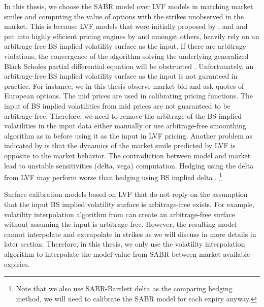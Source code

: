 \documentclass[letterpaper,12pt,titlepage,oneside,final]{book}
\numberwithin{equation}{section}
\theoremstyle{definition}
\begin{document}
In this thesis, we choose the SABR model over LVF models in matching market smiles and computing the value of options with the strikes unobserved in the market. This is because  LVF models that were initially proposed by \citet{dupire1994pricing}, \citet{DermanKani94} and \citet{rubinstein1994implied} and put into highly efficient pricing engines by \citet{Andersenl98} and \citet{dempster2000pricing} amongst others, heavily rely on an arbitrage-free  BS implied volatility surface as the input.  If there are arbitrage violations, the convergence of the algorithm solving the underlying generalized Black Scholes partial differential equation will be obstructed \cite{fengler2009arbitrage}. Unfortunately, an arbitrage-free BS implied volatility surface as the input is not guranteed in practice. For instance, we in this thesis observe market bid and ask quotes of European options. The mid prices are  used in calibrating pricing functions.  The input of BS implied volatilities from mid prices are not guaranteed to be arbitrage-free. Therefore, we need to remove the arbitrage of the BS implied volatilities in the input data either manually or use arbitrage-free smoonthing algorithm as in \cite{fengler2009arbitrage} before using it as the input in LVF pricing. Another problem as indicated by \citet{hagan2002managing} is that the dynamics of the market smile predicted by LVF is opposite to the market behavior. The contradiction between model and market lead to unstable sensitivities (delta, vega) computation. Hedging using the delta from LVF may perform worse than hedging using BS implied delta \cite{hagan2002managing}. \footnote{Note that we also use SABR-Bartlett delta as the comparing hedging method, we will need to calibrate the SABR model for each expiry anyway.}

Surface calibration models based on LVF that do not reply on  the assumption that the input BS implied volatility surface is arbitrage-free exists. For example, volatility interpolation algorithm from \citet{andreasen2010volatility} can create an arbitrage-free surface without assuming the  input is arbitrage-free. However, the resulting model cannot interpolate and extrapolate in strikes as we will discuss in more details in later section.  Therefore, in this thesis, we only use the volatility interpolation algorithm \cite{andreasen2010volatility} to interpolate the model value from SABR between market available expiries.

\end{document}
